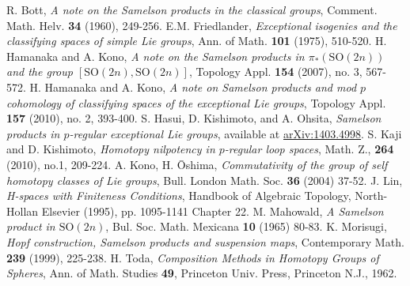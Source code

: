 \documentclass[12pt]{amsart}
\numberwithin{equation}{section}
\theoremstyle{definition}
\theoremstyle{remark}
\begin{document}
\begin{thebibliography}{HKO}
R. Bott, {\it A note on the Samelson products in the classical groups}, Comment. Math. Helv. {\bf 34} (1960), 249-256.
E.M. Friedlander, {\it Exceptional isogenies and the classifying spaces of simple Lie groups}, Ann. of Math. {\bf	101} (1975), 510-520.
H. Hamanaka and A. Kono, {\it A note on the Samelson products in $\pi_*({\mathrm{SO}}(2n))$ and the group $[{\mathrm{SO}}(2n),{\mathrm{SO}}(2n)]$}, Topology Appl. {\bf 154} (2007), no. 3, 567-572.
H. Hamanaka and A. Kono, {\it A note on Samelson products and mod $p$ cohomology of  classifying spaces of the exceptional Lie groups}, Topology Appl. {\bf 157} (2010), no. 2, 393-400.
S. Hasui, D. Kishimoto, and A. Ohsita, {\it Samelson products in $p$-regular exceptional Lie groups}, available at \url{arXiv:1403.4998}.
S. Kaji and D. Kishimoto, {\it Homotopy nilpotency in $p$-regular loop spaces}, Math. Z., {\bf 264} (2010), no.1, 209-224.
A. Kono, H. \={O}shima, {\it Commutativity of the group of self homotopy classes of Lie groups}, Bull. London Math. Soc. {\bf 36} (2004) 37-52.
J. Lin,  {\it H-spaces with Finiteness Conditions}, Handbook of Algebraic Topology, North-Hollan Elsevier (1995), pp. 1095-1141 Chapter 22.
M. Mahowald, {\it A Samelson product in ${\mathrm{SO}}(2n)$}, Bul. Soc. Math. Mexicana {\bf 10} (1965) 80-83.
K. Morisugi, {\it Hopf construction, Samelson products and suspension maps}, Contemporary Math. {\bf 239} (1999), 225-238.
H. Toda, {\it Composition Methods in Homotopy Groups of Spheres}, Ann. of Math. Studies {\bf 49}, Princeton Univ. Press, Princeton N.J., 1962.
\end{thebibliography}
\end{document}
